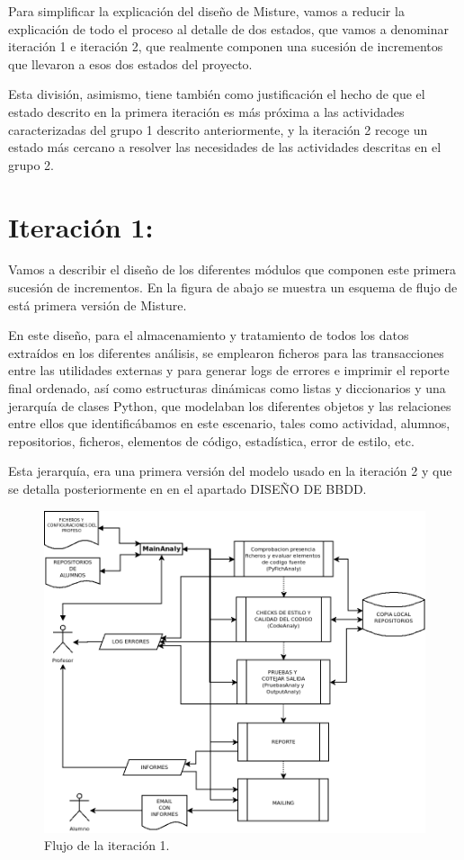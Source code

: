 Para simplificar la explicación del diseño de Misture, vamos a reducir la explicación de todo el proceso al detalle de dos estados, que vamos a denominar iteración 1 e iteración 2, que realmente componen una sucesión de incrementos que llevaron a esos dos estados del proyecto.


Esta división, asimismo, tiene también como justificación el hecho de que el estado descrito en la primera iteración es más próxima a las actividades caracterizadas del grupo 1 descrito anteriormente, y la iteración 2 recoge un estado más cercano a resolver las necesidades de las actividades descritas en el grupo 2.

\section{Iteración 1:}

Vamos a describir el diseño de los diferentes módulos que componen este primera sucesión de incrementos. En la figura de abajo se muestra un esquema de flujo de está primera versión de Misture.


En este diseño, para el almacenamiento y tratamiento de todos los datos extraídos en los diferentes análisis, se emplearon ficheros para las transacciones entre las utilidades externas y para generar logs de errores e imprimir el reporte final ordenado, así como estructuras dinámicas como listas y diccionarios y una jerarquía de clases Python, que modelaban los diferentes objetos y las relaciones entre ellos que identificábamos en este escenario, tales como actividad, alumnos, repositorios, ficheros, elementos de código, estadística, error de estilo, etc.


Esta jerarquía, era una primera versión del modelo usado en la iteración 2 y que se detalla posteriormente en en el apartado DISEÑO DE BBDD.



\begin{figure}[H]
   \centering
   \includegraphics[width=12cm]{img/Diagram2_iteracion1}
   \caption{Flujo de la iteración 1.}
   \label{figura:ite1}
\end{figure}


